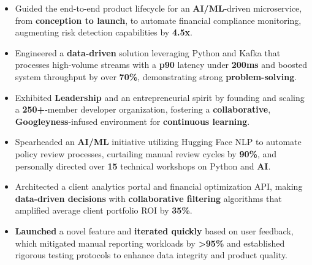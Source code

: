 \documentclass[a4paper]{extarticle}
\begin{document}
\n\begin{itemize}[noitemsep, topsep=0pt, leftmargin=*]\n    \item Guided the end-to-end product lifecycle for an \textbf{AI/ML}-driven microservice, from \textbf{conception to launch}, to automate financial compliance monitoring, augmenting risk detection capabilities by \textbf{4.5x}.\n    \item Engineered a \textbf{data-driven} solution leveraging Python and Kafka that processes high-volume streams with a \textbf{p90} latency under \textbf{200ms} and boosted system throughput by over \textbf{70\%}, demonstrating strong \textbf{problem-solving}.\n\end{itemize}\n\n{}\n\begin{itemize}[noitemsep, topsep=0pt, leftmargin=*]\n    \item Exhibited \textbf{Leadership} and an entrepreneurial spirit by founding and scaling a \textbf{250+}-member developer organization, fostering a \textbf{collaborative}, \textbf{Googleyness}-infused environment for \textbf{continuous learning}.\n    \item Spearheaded an \textbf{AI/ML} initiative utilizing Hugging Face NLP to automate policy review processes, curtailing manual review cycles by \textbf{90\%}, and personally directed over \textbf{15} technical workshops on Python and \textbf{AI}.\n\end{itemize}\n\n{}\n\begin{itemize}[noitemsep, topsep=0pt, leftmargin=*]\n    \item Architected a client analytics portal and financial optimization API, making \textbf{data-driven decisions} with \textbf{collaborative filtering} algorithms that amplified average client portfolio ROI by \textbf{35\%}.\n    \item \textbf{Launched} a novel feature and \textbf{iterated quickly} based on user feedback, which mitigated manual reporting workloads by \textbf{>95\%} and established rigorous testing protocols to enhance data integrity and product quality.\n\end{itemize}\n{}\n\hspace{0pt}\n\EndAccSupp{}
\end{document}
